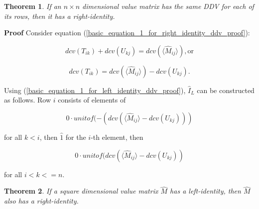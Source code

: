 \documentclass[10pt,letterpaper]{article}
\newtheorem{thm}{Theorem}[section]
\newenvironment{proof}{\noindent\textbf{Proof} }{\qed \newline}
\newcommand{\qed}{\nobreak \ifvmode \relax \else
      \ifdim\lastskip<1.5em \hskip-\lastskip
      \hskip1.5em plus0em minus0.5em \fi \nobreak
      \vrule height0.75em width0.5em depth0.25em\fi}
\numberwithin{equation}{section}
\begin{document}
\begin{thm} \label{if_same_row_ddvs_then_IR} If an $n \times n$
  dimensional value matrix has the same DDV for each of its rows, then
  it has a right-identity.\end{thm}

\begin{proof} Consider equation
  (\ref{basic_equation_1_for_right_identity_ddv_proof}):

\[ dcv(T_{ik}) + dcv(U_{kj}) = dcv( \langle \hat M_{ij} \rangle ) , \mbox{or} \]

\begin{equation} dcv(T_{ik}) = dcv( \langle \hat M_{ij} \rangle ) - dcv(U_{kj}) . \end{equation}

Using (\ref{basic_equation_1_for_left_identity_ddv_proof}), $\hat I_L$
can be constructed as follows.  Row $i$ consists of elements of

\[ 0 \cdot unitof( -(dcv( \langle \hat M_{ij} \rangle - dcv(U_{kj}))) \]

for all $k < i$, then $\hat 1$ for the $i$-th element, then

\[ 0 \cdot unitof( dcv( \langle \hat M_{ij} \rangle - dcv(U_{kj})) \]

for all $i < k <= n$. \end{proof}

\begin{thm}If a square dimensional value matrix $\hat M$  has a
  left-identity, then $\hat M$ also has a right-identity.\end{thm}
\end{document}
